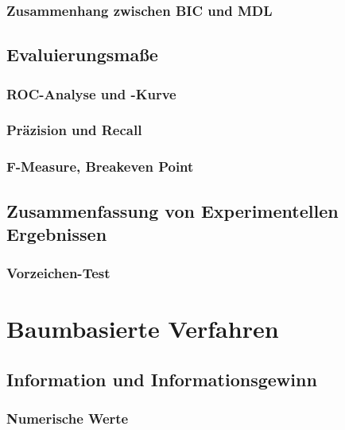 		\subsection{Zusammenhang zwischen BIC und MDL} %

	\section{Evaluierungsmaße} %

		\subsection{ROC-Analyse und -Kurve} %

		\subsection{Präzision und Recall} %

		\subsection{F-Measure, Breakeven Point} %

	\section{Zusammenfassung von Experimentellen Ergebnissen} %

		\subsection{Vorzeichen-Test} %

\chapter{Baumbasierte Verfahren} %

	\section{Information und Informationsgewinn} %

		\subsection{Numerische Werte} %

